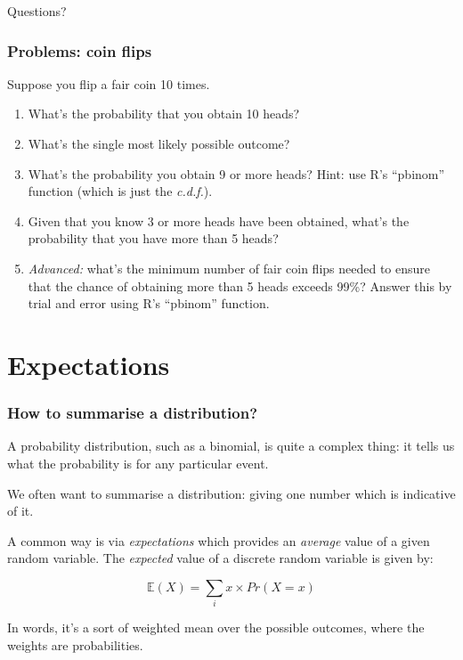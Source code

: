 \documentclass{beamer}
\begin{document}
	\begin{frame}
		\Large Questions?
	\end{frame}
	
	\begin{frame}
		\frametitle{Problems: coin flips}
		
		Suppose you flip a fair coin 10 times.
		
		\begin{enumerate}
			\item What's the probability that you obtain 10 heads?
			\item What's the single most likely possible outcome?
			\item What's the probability you obtain 9 or more heads? Hint: use R's ``pbinom'' function (which is just the \textit{c.d.f.}).
			\item Given that you know 3 or more heads have been obtained, what's the probability that you have more than 5 heads?
			\item \textit{Advanced:} what's the minimum number of fair coin flips needed to ensure that the chance of obtaining more than 5 heads exceeds 99\%? Answer this by trial and error using R's ``pbinom'' function.
		\end{enumerate}
		
	\end{frame}
	
	\section{Expectations}
	\frame{\tableofcontents[currentsection]}
	
	\begin{frame}
		\frametitle{How to summarise a distribution?}
		
		A probability distribution, such as a binomial, is quite a complex thing: it tells us what the probability is for any particular event.
		
		\vspace{0.5cm}
		
		We often want to summarise a distribution: giving one number which is indicative of it.
		
		\vspace{0.5cm}
		
		A common way is via \textit{expectations} which provides an \textit{average} value of a given random variable. The \textit{expected} value of a discrete random variable is given by:
		
		\begin{equation}
		\mathbb{E}(X) = \sum_{i} x \times Pr(X=x)
		\end{equation}
		
		In words, it's a sort of weighted mean over the possible outcomes, where the weights are probabilities.
		
	\end{frame}
	
\end{document}
